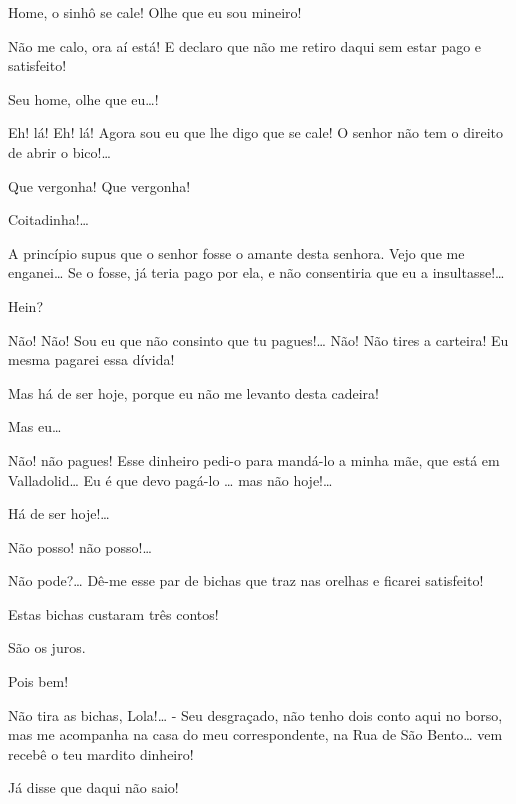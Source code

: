  Home, o sinhô se cale! Olhe que eu sou mineiro!

 Não me calo, ora aí está! E declaro que não me retiro daqui sem
estar pago e satisfeito! 

 Seu home, olhe que eu\ldots{}!

  Eh! lá! Eh! lá! Agora sou eu que lhe digo que se
cale! O senhor não tem o direito de abrir o bico!\ldots{}

  Que vergonha! Que vergonha!

  Coitadinha!\ldots{}

 A princípio supus que o senhor fosse o amante desta senhora.
Vejo que me enganei\ldots{} Se o fosse, já teria pago por ela, e não consentiria que
eu a insultasse!\ldots{}

 Hein?

  Não! Não! Sou eu que não
consinto que tu pagues!\ldots{} Não! Não tires a carteira! Eu mesma pagarei essa dívida!

 Mas há de ser hoje, porque eu não me levanto desta cadeira!

 Mas eu\ldots{}

 Não! não pagues! Esse dinheiro pedi-o para mandá-lo a minha mãe, que
está em Valladolid\ldots{} Eu é que devo pagá-lo \ldots{} mas não hoje!\ldots{}

  Há de ser hoje!\ldots{}

 Não posso! não posso!\ldots{}

 Não pode?\ldots{} Dê-me esse par de bichas que traz nas orelhas e
ficarei satisfeito!

 Estas bichas custaram três contos!

 São os juros.

 Pois bem! 

  Não tira as bichas, Lola!\ldots{} 
- Seu desgraçado, não tenho dois conto aqui no borso, mas me acompanha na casa do
meu correspondente, na Rua de São Bento\ldots{} vem recebê o teu mardito
dinheiro!

  Já disse que daqui não saio!


